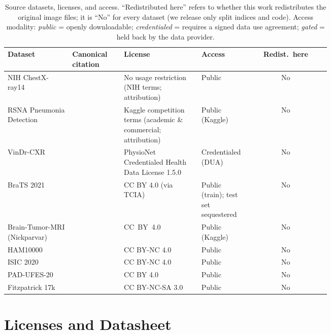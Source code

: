 \documentclass{article}
\begin{document}
\begin{table}[t]
  \centering
  \caption{Source datasets, licenses, and access. ``Redistributed here'' refers
  to whether this work redistributes the original image files; it is ``No'' for
  every dataset (we release only split indices and code). Access modality:
  \emph{public} = openly downloadable; \emph{credentialed} = requires a signed
  data use agreement; \emph{gated} = held back by the data provider.}
  \label{tab:datasets}
  \footnotesize
  \begin{tabular}{p{0.20\linewidth}p{0.16\linewidth}p{0.24\linewidth}p{0.14\linewidth}c}
    \toprule
    Dataset & Canonical citation & License & Access & Redist.\ here \\
    \midrule
    NIH ChestX-ray14 & \citep{wang2017chestxray8} & No usage restriction (NIH terms; attribution) & Public & No \\
    RSNA Pneumonia Detection & \citep{rsna2018pneumonia,shih2019augmenting} & Kaggle competition terms (academic \& commercial; attribution) & Public (Kaggle) & No \\
    VinDr-CXR & \citep{nguyen2022vindrcxr} & PhysioNet Credentialed Health Data License 1.5.0 & Credentialed (DUA) & No \\
    BraTS 2021 & \citep{baid2021brats,menze2015brats,bakas2017advancing,baid2021bratstcia} & CC BY 4.0 (via TCIA) & Public (train); test set sequestered & No \\
    Brain-Tumor-MRI (Nickparvar) & \citep{nickparvar2021braintumormri,cheng2015braintumor} & CC~BY~4.0 & Public (Kaggle) & No \\
    HAM10000 & \citep{tschandl2018ham10000} & CC BY-NC 4.0 & Public & No \\
    ISIC 2020 & \citep{rotemberg2021isic2020} & CC BY-NC 4.0 & Public & No \\
    PAD-UFES-20 & \citep{pacheco2020padufes20} & CC BY 4.0 & Public & No \\
    Fitzpatrick 17k & \citep{groh2021fitzpatrick17k} & CC BY-NC-SA 3.0 & Public & No \\
    \bottomrule
  \end{tabular}
\end{table}

\section{Licenses and Datasheet}
\end{document}
